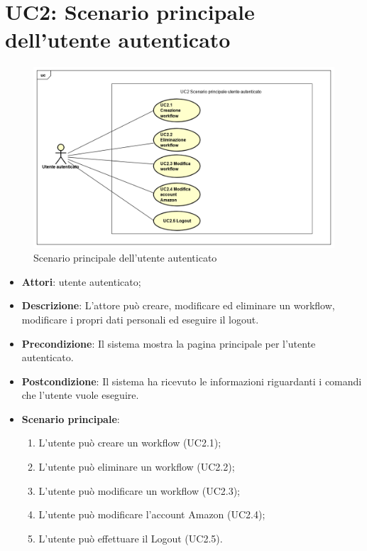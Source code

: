 \section{UC2: Scenario principale dell'utente autenticato}
\label{UC2}
\begin{figure} [h]
	\centering
	\includegraphics[scale=0.4]{./Diagram/UC2.png}
	\caption{Scenario principale dell'utente autenticato }\label{}
\end{figure}
\begin{itemize}
	\item \textbf{Attori}: utente autenticato;
	\item \textbf{Descrizione}: L'attore può creare, modificare ed eliminare un workflow, modificare i propri dati personali ed eseguire il logout.
	\item \textbf{Precondizione}: Il sistema mostra la pagina principale per l'utente autenticato.
	\item \textbf{Postcondizione}: Il sistema ha ricevuto le informazioni riguardanti i comandi che l'utente vuole eseguire.
	\item \textbf{Scenario principale}:
	\begin{enumerate} \item L'utente può creare un workflow (UC2.1);  \item  L'utente può eliminare un workflow (UC2.2);  \item 
		L'utente può modificare un workflow (UC2.3);  \item  L'utente può modificare l'account Amazon (UC2.4);  \item 
		L'utente può effettuare il Logout (UC2.5).\end{enumerate}
\end{itemize}

